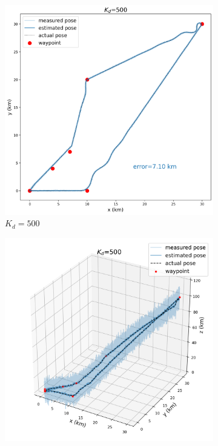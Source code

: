 \begin{figure}[h]
	\centering
	\begin{subfigure}[t]{0.24\textwidth}
		\centering
		\includegraphics[width=\linewidth]{figures/Dgain_D05_2d.png}
		\caption{$K_d=500$}
	\end{subfigure} 
	\hfill
	\begin{subfigure}[t]{0.24\textwidth}
		\centering
		\includegraphics[width=\linewidth]{figures/Dgain_D05_3d.png}

\end{subfigure}
\end{figure}
